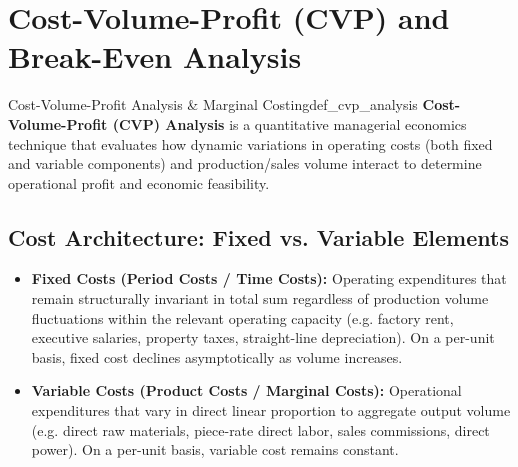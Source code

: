 \newpage
\section{Cost-Volume-Profit (CVP) and Break-Even Analysis}

\begin{definition}{Cost-Volume-Profit Analysis \& Marginal Costing}{def_cvp_analysis}
\textbf{Cost-Volume-Profit (CVP) Analysis} is a quantitative managerial economics technique that evaluates how dynamic variations in operating costs (both fixed and variable components) and production/sales volume interact to determine operational profit and economic feasibility.
\end{definition}

\subsection{Cost Architecture: Fixed vs. Variable Elements}
\begin{itemize}[leftmargin=*, topsep=2pt, itemsep=2pt]
    \item \textbf{Fixed Costs (Period Costs / Time Costs):} Operating expenditures that remain structurally invariant in total sum regardless of production volume fluctuations within the relevant operating capacity (e.g. factory rent, executive salaries, property taxes, straight-line depreciation). On a per-unit basis, fixed cost declines asymptotically as volume increases.
    \item \textbf{Variable Costs (Product Costs / Marginal Costs):} Operational expenditures that vary in direct linear proportion to aggregate output volume (e.g. direct raw materials, piece-rate direct labor, sales commissions, direct power). On a per-unit basis, variable cost remains constant.
\end{itemize}


